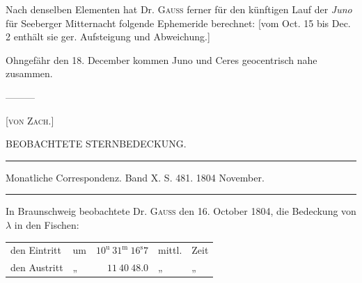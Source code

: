 \indent Nach denselben Elementen hat Dr. \textsc{Gauss} ferner für den künftigen Lauf der \emph{Juno} für Seeberger
Mitternacht folgende Ephemeride berechnet: [vom Oct. 15 bis Dec. 2 enthält sie ger. Aufsteigung und
Abweichung.]

Ohngefähr den 18. December kommen Juno und Ceres geocentrisch nahe zusammen.

\noindent—\quad—\quad—\par

\hfill[\textsc{von Zach.}]

\begin{center}
BEOBACHTETE STERNBEDECKUNG.
\end{center}

\begin{center}
\rule{0.6\linewidth}{0.4pt}

Monatliche Correspondenz. Band X. S. 481. 1804 November.

\rule{0.6\linewidth}{0.4pt}
\end{center}

In Braunschweig beobachtete Dr. \textsc{Gauss} den 16. October 1804, die Bedeckung von $\lambda$ in den Fischen:

\begin{center}
\begingroup\fontsize{10}{12}\selectfont\setlength{\tabcolsep}{3pt}\renewcommand{\arraystretch}{1.1}
\begin{tabular}{llrll}
den Eintritt & um & $10^{\mathrm u}\ 31^{\mathrm m}\ 16^{\mathrm s}7$ & mittl. & Zeit \\
den Austritt & „ & $11\ 40\ 48.0$ & „ & „ \\
\end{tabular}\endgroup
\end{center}

